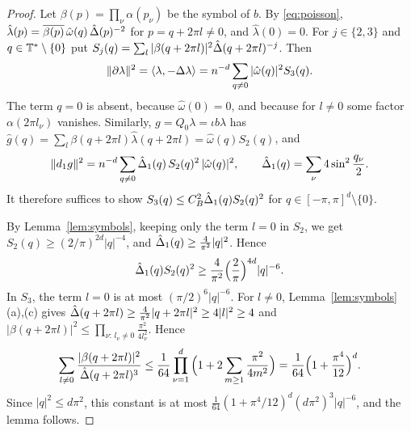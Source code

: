 \begin{proof}
Let $\beta(p)=\prod_\nu\alpha(p_\nu)$ be the symbol of $b$. By \eqref{eq:poisson}, $\hat\lambda(p)=\overline{\beta(p)}\,\hat\omega(q)\,\hat{\Delta}(p)^{-2}$ for $p=q+2\pi l\ne0$, and $\hat\lambda(0)=0$. For $j\in\{2,3\}$ and $q\in\mathbb T^*\setminus\{0\}$ put $S_j(q)=\sum_l|\beta(q+2\pi l)|^2\hat{\Delta}(q+2\pi l)^{-j}$. Then
\[
\|\partial\lambda\|^2=\langle \lambda,-\Delta\lambda\rangle=n^{-d}\sum_{q\ne0}|\hat\omega(q)|^2S_3(q).
\]
The term $q=0$ is absent, because $\hat\omega(0)=0$, and because for $l\ne0$ some factor $\alpha(2\pi l_\nu)$ vanishes. Similarly, $g=Q_0\lambda=\iota b\lambda$ has $\hat g(q)=\sum_l\beta(q+2\pi l)\hat\lambda(q+2\pi l)=\hat\omega(q)S_2(q)$, and
\[
\|d_1 g\|^2=n^{-d}\sum_{q\ne0}\hat{\Delta}_1(q)\,S_2(q)^2\,|\hat\omega(q)|^2,\qquad \hat{\Delta}_1(q)=\sum_\nu4\sin^2\frac{q_\nu}2 .
\]
It therefore suffices to show $S_3(q)\le C_B^2\hat{\Delta}_1(q)S_2(q)^2$ for $q\in[-\pi,\pi]^d\setminus\{0\}$.

By Lemma~\ref{lem:symbols}, keeping only the term $l=0$ in $S_2$, we get $S_2(q)\ge(2/\pi)^{2d}|q|^{-4}$, and $\hat{\Delta}_1(q)\ge\frac4{\pi^2}|q|^2$. Hence
\[
\hat{\Delta}_1(q)S_2(q)^2\ge\frac4{\pi^2}\Big(\frac2\pi\Big)^{4d}|q|^{-6}.
\]
In $S_3$, the term $l=0$ is at most $(\pi/2)^6|q|^{-6}$. For $l\ne0$, Lemma~\ref{lem:symbols}(a),(c) gives $\hat{\Delta}(q+2\pi l)\ge\frac4{\pi^2}|q+2\pi l|^2\ge4|l|^2\ge4$ and $|\beta(q+2\pi l)|^2\le\prod_{\nu:\,l_\nu\ne0}\frac{\pi^2}{4l_\nu^2}$. Hence
\[
\sum_{l\ne0}\frac{|\beta(q+2\pi l)|^2}{\hat{\Delta}(q+2\pi l)^3}\le\frac1{64}\prod_{\nu=1}^d\Big(1+2\sum_{m\ge1}\frac{\pi^2}{4m^2}\Big)=\frac1{64}\Big(1+\frac{\pi^4}{12}\Big)^d .
\]
Since $|q|^2\le d\pi^2$, this constant is at most $\frac1{64}(1+\pi^4/12)^d(d\pi^2)^3|q|^{-6}$, and the lemma follows.
\end{proof}
